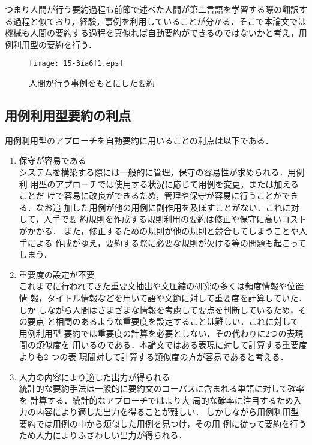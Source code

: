\documentclass[japanese]{jnlp_1.4}
\begin{document}
つまり人間が行う要約過程も前節で述べた人間が第二言語を学習する際の翻訳す
る過程と似ており，経験，事例を利用していることが分かる．そこで本論文では
機械も人間の要約する過程を真似れば自動要約ができるのではないかと考え，用
例利用型の要約を行う．

\begin{figure}[t]
\begin{center}
\texttt{[image: 15-3ia6f1.eps]}
\caption{人間が行う事例をもとにした要約} \label{人間が考える要約}
\end{center}
\end{figure}


\subsection{用例利用型要約の利点}\label{節:用例利用型要約の利点}

用例利用型のアプローチを自動要約に用いることの利点は以下である．
\begin{enumerate}
 \item 保守が容易である\\ 
システムを構築する際には一般的に管理，保守の容易性が求められる．用例利
用型のアプローチでは使用する状況に応じて用例を変更，または加えることだ
けで容易に改良ができるため，管理や保守が容易に行うことができる．なお追
加した用例が他の用例に副作用を及ぼすことがない．これに対して，人手で要
約規則を作成する規則利用の要約は修正や保守に高いコストがかかる．
また，修正するための規則が他の規則と競合してしまうことや人手による
作成がゆえ，要約する際に必要な規則が欠ける等の問題も起こってしまう．

\item 重要度の設定が不要\\ 
これまでに行われてきた重要文抽出や文圧縮の研究の多くは頻度情報や位置情
報，タイトル情報などを用いて語や文節に対して重要度を計算していた．しか
しながら人間はさまざまな情報を考慮して要点を判断しているため，その要点
と相関のあるような重要度を設定することは難しい．これに対して用例利用型
要約では重要度の計算を必要としない．その代わりに2つの表現間の類似度を
用いるのである．本論文ではある表現に対して計算する重要度よりも2 つの表
現間対して計算する類似度の方が容易であると考える．

\item 入力の内容により適した出力が得られる\\
統計的な要約手法は一般的に要約文のコーパスに含まれる単語に対して確率を
計算する\cite{Witbrock:1999,Knight:2002}．統計的なアプローチではより大
局的な確率に注目するため入力の内容により適した出力を得ることが難しい．
しかしながら用例利用型要約では用例の中から類似した用例を見つけ，その用
例に従って要約を行うため入力によりふさわしい出力が得られる．
\end{enumerate}
\end{document}
